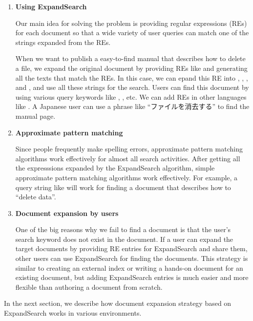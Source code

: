 \documentclass[manuscript,anonymous,review]{acmart}
\def\ES{\textsf{ExpandSearch}}
\begin{document}
\begin{enumerate}
  
\item \textbf{Using ExpandSearch}
  
  Our main idea for solving the problem is 
  providing regular expressions (REs)
  for  each document so that a wide variety of user queries can match one of the
  strings expanded from the REs.
  
  When we want to publish a easy-to-find manual that describes how to delete a file,
  we expand the original document by
  providing REs like 
  and generating all the texts that match the REs.
  In this case, we can epand this RE into
  ,
  ,
  , and
  ,
  and use all these strings for the search.
  Users can find this document by using various query keywords like
  , , etc.
  We can add REs in other languages
  like .
  A Japanese user can use a phrase like ``ファイルを消去する'' to find the manual page.

\item \textbf{Approximate pattern matching}

  Since people frequently make spelling errors,
  approximate pattern matching algorithms
  work effectively for almost all search activities.
  After getting all the expresssions expanded by the {\ES} algorithm,
  simple approximate pattern matching algorithms work effectively.
  For example, a query string like  will work for
  finding a document that describes how to ``delete data''.

\item \textbf{Document expansion by users}

  One of the big reasons why we fail to find a document is that
  the user's search keyword does not exist in the document.
  If a user can expand the target documents by
  providing RE entries for {\ES} and share them,
  other users can use {\ES} for finding the documents.
  This strategy is similar to creating an external index or
  writing a hands-on document for an existing document,
  but adding {\ES} entries is much easier and more flexible than
  authoring a document from scratch.

\end{enumerate}

In the next section, we describe how
document expansion strategy based on {\ES} works in various environments.
\end{document}
